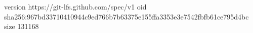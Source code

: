 version https://git-lfs.github.com/spec/v1
oid sha256:967bd33710410944c9ed766b7b63375e155ffa3353e3e7542fbfb61ce795d4bc
size 131168
